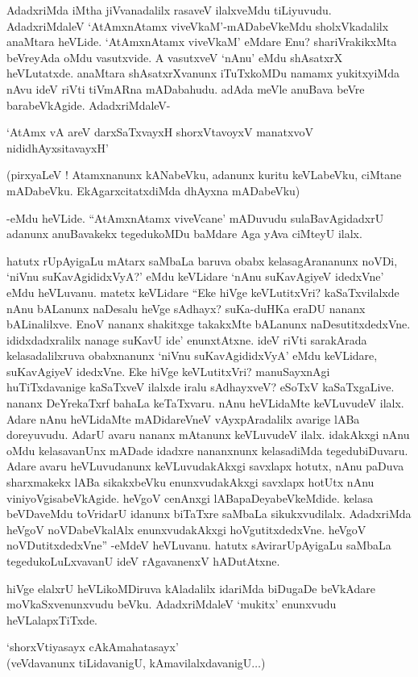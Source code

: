 AdadxriMda iMtha jiVvanadalilx rasaveV ilalxveMdu tiLiyuvudu. AdadxriMdaleV `AtAmxnAtamx viveVkaM'-mADabeVkeMdu sholxVkadalilx anaMtara heVLide. `AtAmxnAtamx viveVkaM' eMdare Enu? shariVrakikxMta beVreyAda oMdu vasutxvide. A vasutxveV `nAnu' eMdu shAsatxrX heVLutatxde. anaMtara shAsatxrXvanunx iTuTxkoMDu namamx yukitxyiMda nAvu ideV riVti tiVmARna mADabahudu. adAda meVle anuBava beVre barabeVkAgide. AdadxriMdaleV-

\begin{shloka}
`AtAmx vA areV darxSaTxvayxH shorxVtavoyxV manatxvoV nididhAyxsitavayxH'
\end{shloka}

(pirxyaLeV ! Atamxnanunx kANabeVku, adanunx kuritu keVLabeVku, ciMtane mADabeVku. EkAgarxcitatxdiMda dhAyxna mADabeVku)

-eMdu heVLide. ``AtAmxnAtamx viveVcane' mADuvudu sulaBavAgidadxrU adanunx anuBavakekx tegedukoMDu baMdare Aga yAva ciMteyU ilalx.

hatutx rUpAyigaLu mAtarx saMbaLa baruva obabx kelasagArananunx noVDi, `niVnu suKavAgididxVyA?' eMdu keVLidare `nAnu suKavAgiyeV idedxVne' eMdu heVLuvanu. matetx keVLidare ``Eke hiVge keVLutitxVri? kaSaTxvilalxde nAnu bALanunx naDesalu heVge sAdhayx? suKa-duHKa eraDU nananx bALinalilxve. EnoV nananx shakitxge takakxMte bALanunx naDesutitxdedxVne. ididxdadxralilx nanage suKavU ide' enunxtAtxne. ideV riVti sarakArada kelasadalilxruva obabxnanunx `niVnu suKavAgididxVyA' eMdu keVLidare, suKavAgiyeV idedxVne. Eke hiVge keVLutitxVri? manuSayxnAgi huTiTxdavanige kaSaTxveV ilalxde iralu sAdhayxveV? eSoTxV kaSaTxgaLive. nananx DeYrekaTxrf bahaLa keTaTxvaru. nAnu heVLidaMte keVLuvudeV ilalx. Adare nAnu heVLidaMte mADidareVneV vAyxpAradalilx avarige lABa doreyuvudu. AdarU avaru nananx mAtanunx keVLuvudeV ilalx. idakAkxgi nAnu oMdu kelasavanUnx mADade idadxre nananxnunx kelasadiMda tegedubiDuvaru. Adare avaru heVLuvudanunx keVLuvudakAkxgi savxlapx hotutx, nAnu paDuva sharxmakekx lABa sikakxbeVku enunxvudakAkxgi savxlapx hotUtx nAnu viniyoVgisabeVkAgide. heVgoV cenAnxgi lABapaDeyabeVkeMdide. kelasa beVDaveMdu toVridarU idanunx biTaTxre saMbaLa sikukxvudilalx. AdadxriMda heVgoV noVDabeVkalAlx enunxvudakAkxgi hoVgutitxdedxVne. heVgoV noVDutitxdedxVne'' -eMdeV heVLuvanu. hatutx sAvirarUpAyigaLu saMbaLa tegedukoLuLxvavanU ideV rAgavanenxV hADutAtxne.

hiVge elalxrU heVLikoMDiruva kAladalilx idariMda biDugaDe beVkAdare moVkaSxvenunxvudu beVku. AdadxriMdaleV `mukitx' enunxvudu heVLalapxTiTxde.

\begin{shloka}
`shorxVtiyasayx cAkAmahatasayx'\\
(veVdavanunx tiLidavanigU, kAmavilalxdavanigU$\ldots$)
\end{shloka}


